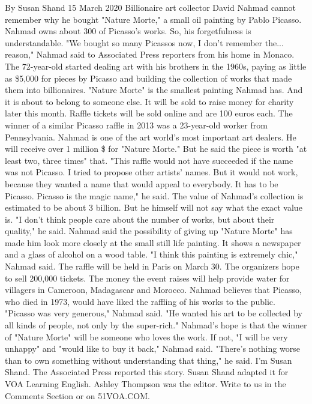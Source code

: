 By Susan Shand
15 March 2020
Billionaire art collector David Nahmad cannot remember why he bought "Nature Morte," a small oil painting by Pablo Picasso.
Nahmad owns about 300 of Picasso's works. So, his forgetfulness is understandable.
"We bought so many Picassos now, I don't remember the... reason," Nahmad said to Associated Press reporters from his home in Monaco.
The 72-year-old started dealing art with his brothers in the 1960s, paying as little as \$5,000 for pieces by Picasso and building the collection of works that made them into billionaires.
"Nature Morte" is the smallest painting Nahmad has. And it is about to belong to someone else. It will be sold to raise money for charity later this month.
Raffle tickets will be sold online and are 100 euros each. The winner of a similar Picasso raffle in 2013 was a 23-year-old worker from Pennsylvania.
Nahmad is one of the art world's most important art dealers. He will receive over 1 million \$ for "Nature Morte." But he said the piece is worth "at least two, three times" that.
"This raffle would not have succeeded if the name was not Picasso. I tried to propose other artists' names. But it would not work, because they wanted a name that would appeal to everybody. It has to be Picasso. Picasso is the magic name," he said.
The value of Nahmad's collection is estimated to be about 3 billion. But he himself will not say what the exact value is.
"I don't think people care about the number of works, but about their quality," he said.
Nahmad said the possibility of giving up "Nature Morte" has made him look more closely at the small still life painting. It shows a newspaper and a glass of alcohol on a wood table.
"I think this painting is extremely chic," Nahmad said.
The raffle will be held in Paris on March 30. The organizers hope to sell 200,000 tickets. The money the event raises will help provide water for villagers in Cameroon, Madagascar and Morocco.
Nahmad believes that Picasso, who died in 1973, would have liked the raffling of his works to the public.
"Picasso was very generous," Nahmad said. "He wanted his art to be collected by all kinds of people, not only by the super-rich."
Nahmad's hope is that the winner of "Nature Morte" will be someone who loves the work. If not, "I will be very unhappy" and "would like to buy it back," Nahmad said.
"There's nothing worse than to own something without understanding that thing," he said.
I'm Susan Shand.
The Associated Press reported this story. Susan Shand adapted it for VOA Learning English. Ashley Thompson was the editor.
Write to us in the Comments Section or on 51VOA.COM. \newline

